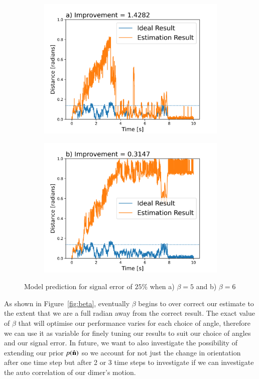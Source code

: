 \documentclass[final, 3p]{elsarticle}
\begin{document}
\begin{figure}
	\label{fig:beta}
	\centering
	\begin{subfigure}{0.49\textwidth}
		\includegraphics[width=\textwidth]{./Images/beta_5.png}
	\end{subfigure}
	\begin{subfigure}{0.49\textwidth}
		\includegraphics[width=\textwidth]{./Images/beta_6.png}
	\end{subfigure}
	\caption{Model prediction for signal error of $25\%$ when a) $\beta = 5$ and b) $\beta=6$}
\end{figure}

As shown in Figure~\ref{fig:beta}, eventually $\beta$ begins to over
correct our estimate to the extent that we are a full radian away from
the correct result.  The exact value of $\beta$ that will optimise our
performance varies for each choice of angle, therefore we can use it
as variable for finely tuning our results to suit our choice of angles
and our signal error.  In future, we want to also investigate the
possibility of extending our prior $p(\hat{\bf n})$ so we account for not
just the change in orientation after one time step but after 2 or 3
time steps to investigate if we can investigate the auto correlation
of our dimer's motion.
\end{document}
